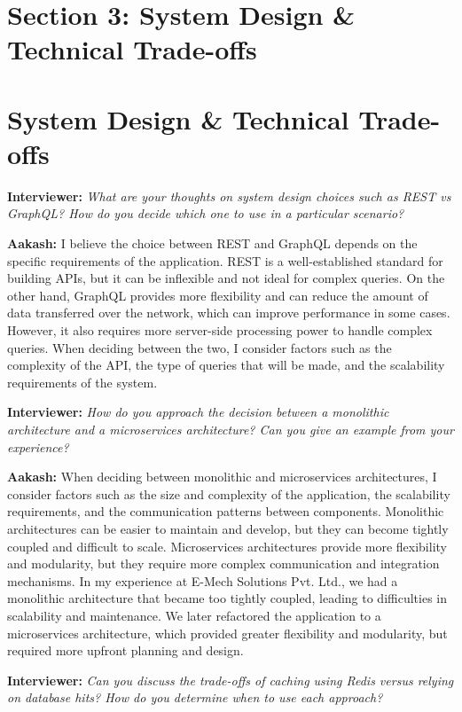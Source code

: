 \documentclass[12pt, a4paper]{article}
\newcommand{\interviewer}[1]{\noindent\textbf{Interviewer: }\textit{#1}\par\vspace{5pt}}
\newcommand{\candidate}[1]{\noindent\textbf{Aakash: }#1\par\vspace{15pt}}
\begin{document}
\section*{Section 3: System Design \& Technical Trade-offs}

\section*{System Design \& Technical Trade-offs}
\interviewer{What are your thoughts on system design choices such as REST vs GraphQL? How do you decide which one to use in a particular scenario?}

\candidate{I believe the choice between REST and GraphQL depends on the specific requirements of the application. REST is a well-established standard for building APIs, but it can be inflexible and not ideal for complex queries. On the other hand, GraphQL provides more flexibility and can reduce the amount of data transferred over the network, which can improve performance in some cases. However, it also requires more server-side processing power to handle complex queries. When deciding between the two, I consider factors such as the complexity of the API, the type of queries that will be made, and the scalability requirements of the system.}

\interviewer{How do you approach the decision between a monolithic architecture and a microservices architecture? Can you give an example from your experience?}

\candidate{When deciding between monolithic and microservices architectures, I consider factors such as the size and complexity of the application, the scalability requirements, and the communication patterns between components. Monolithic architectures can be easier to maintain and develop, but they can become tightly coupled and difficult to scale. Microservices architectures provide more flexibility and modularity, but they require more complex communication and integration mechanisms. In my experience at E-Mech Solutions Pvt. Ltd., we had a monolithic architecture that became too tightly coupled, leading to difficulties in scalability and maintenance. We later refactored the application to a microservices architecture, which provided greater flexibility and modularity, but required more upfront planning and design.}

\interviewer{Can you discuss the trade-offs of caching using Redis versus relying on database hits? How do you determine when to use each approach?}
\end{document}
